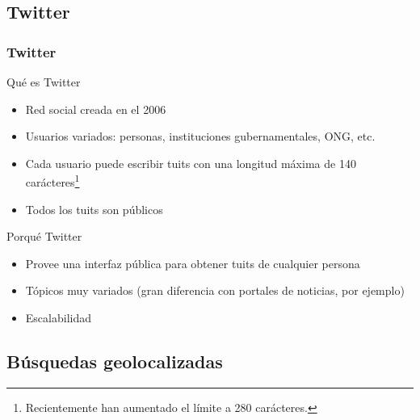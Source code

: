\subsection{Twitter}
\begin{frame}[t]\frametitle{Twitter}

\begin{block}{Qué es Twitter}
    \begin{itemize}
        \item Red social creada en el 2006
        \item Usuarios variados: personas, instituciones gubernamentales, ONG, etc.
        \item Cada usuario puede escribir tuits con una longitud máxima de 140 carácteres{\footnote{Recientemente han aumentado el límite a 280 carácteres.}}
        \item \alert{Todos los tuits son públicos}
    \end{itemize}
\end{block}

\begin{block}{Porqué Twitter}
    \begin{itemize}
        \item Provee una interfaz pública para obtener tuits de cualquier persona
        \item Tópicos muy variados (gran diferencia con portales de noticias, por ejemplo)
        \item Escalabilidad
    \end{itemize}
    
\end{block}


\end{frame}

\subsection{Búsquedas geolocalizadas}



